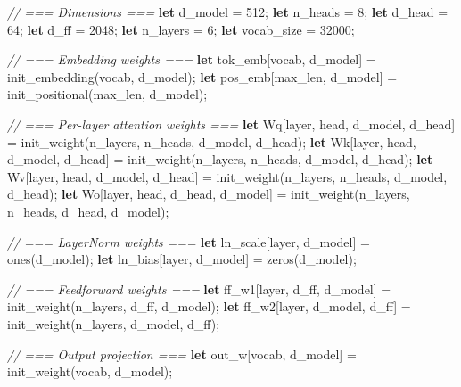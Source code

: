 \documentclass[11pt,]{article}
\newenvironment{Shaded}{}{}
\newcommand{\CommentTok}[1]{\textcolor[rgb]{0.38,0.63,0.69}{\textit{#1}}}
\newcommand{\DecValTok}[1]{\textcolor[rgb]{0.25,0.63,0.44}{#1}}
\newcommand{\KeywordTok}[1]{\textcolor[rgb]{0.00,0.44,0.13}{\textbf{#1}}}
\newcommand{\NormalTok}[1]{#1}
\newcommand{\OperatorTok}[1]{\textcolor[rgb]{0.40,0.40,0.40}{#1}}
\begin{document}
\begin{Shaded}
\begin{Highlighting}[]
\CommentTok{// === Dimensions ===}
\KeywordTok{let}\NormalTok{ d_model = }\DecValTok{512}\NormalTok{;}
\KeywordTok{let}\NormalTok{ n_heads = }\DecValTok{8}\NormalTok{;}
\KeywordTok{let}\NormalTok{ d_head = }\DecValTok{64}\NormalTok{;}
\KeywordTok{let}\NormalTok{ d_ff = }\DecValTok{2048}\NormalTok{;}
\KeywordTok{let}\NormalTok{ n_layers = }\DecValTok{6}\NormalTok{;}
\KeywordTok{let}\NormalTok{ vocab_size = }\DecValTok{32000}\NormalTok{;}

\CommentTok{// === Embedding weights ===}
\KeywordTok{let}\NormalTok{ tok_emb}\OperatorTok{[}\NormalTok{vocab, d_model}\OperatorTok{]}\NormalTok{ = init_embedding(vocab, d_model);}
\KeywordTok{let}\NormalTok{ pos_emb}\OperatorTok{[}\NormalTok{max_len, d_model}\OperatorTok{]}\NormalTok{ = init_positional(max_len, d_model);}

\CommentTok{// === Per-layer attention weights ===}
\KeywordTok{let}\NormalTok{ Wq}\OperatorTok{[}\NormalTok{layer, head, d_model, d_head}\OperatorTok{]}\NormalTok{ = init_weight(n_layers, n_heads, d_model, d_head);}
\KeywordTok{let}\NormalTok{ Wk}\OperatorTok{[}\NormalTok{layer, head, d_model, d_head}\OperatorTok{]}\NormalTok{ = init_weight(n_layers, n_heads, d_model, d_head);}
\KeywordTok{let}\NormalTok{ Wv}\OperatorTok{[}\NormalTok{layer, head, d_model, d_head}\OperatorTok{]}\NormalTok{ = init_weight(n_layers, n_heads, d_model, d_head);}
\KeywordTok{let}\NormalTok{ Wo}\OperatorTok{[}\NormalTok{layer, head, d_head, d_model}\OperatorTok{]}\NormalTok{ = init_weight(n_layers, n_heads, d_head, d_model);}

\CommentTok{// === LayerNorm weights ===}
\KeywordTok{let}\NormalTok{ ln_scale}\OperatorTok{[}\NormalTok{layer, d_model}\OperatorTok{]}\NormalTok{ = ones(d_model);}
\KeywordTok{let}\NormalTok{ ln_bias}\OperatorTok{[}\NormalTok{layer, d_model}\OperatorTok{]}\NormalTok{ = zeros(d_model);}

\CommentTok{// === Feedforward weights ===}
\KeywordTok{let}\NormalTok{ ff_w1}\OperatorTok{[}\NormalTok{layer, d_ff, d_model}\OperatorTok{]}\NormalTok{ = init_weight(n_layers, d_ff, d_model);}
\KeywordTok{let}\NormalTok{ ff_w2}\OperatorTok{[}\NormalTok{layer, d_model, d_ff}\OperatorTok{]}\NormalTok{ = init_weight(n_layers, d_model, d_ff);}

\CommentTok{// === Output projection ===}
\KeywordTok{let}\NormalTok{ out_w}\OperatorTok{[}\NormalTok{vocab, d_model}\OperatorTok{]}\NormalTok{ = init_weight(vocab, d_model);}


\end{Highlighting}
\end{Shaded}
\end{document}
